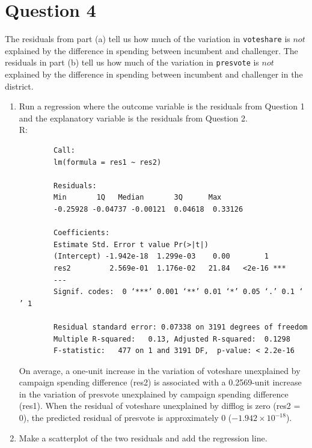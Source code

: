 \documentclass[12pt,letterpaper]{article}
\begin{document}
\section*{Question 4}
\noindent The residuals from part (a) tell us how much of the variation in \texttt{voteshare} is $not$ explained by the difference in spending between incumbent and challenger. The residuals in part (b) tell us how much of the variation in \texttt{presvote} is $not$ explained by the difference in spending between incumbent and challenger in the district.
	\begin{enumerate}
		\item Run a regression where the outcome variable is the residuals from Question 1 and the explanatory variable is the residuals from Question 2.	\\
		
		R:
		
		\begin{verbatim}
		Call:
		lm(formula = res1 ~ res2)
		
		Residuals:
		Min       1Q   Median       3Q      Max 
		-0.25928 -0.04737 -0.00121  0.04618  0.33126 
		
		Coefficients:
		Estimate Std. Error t value Pr(>|t|)    
		(Intercept) -1.942e-18  1.299e-03    0.00        1    
		res2         2.569e-01  1.176e-02   21.84   <2e-16 ***
		---
		Signif. codes:  0 ‘***’ 0.001 ‘**’ 0.01 ‘*’ 0.05 ‘.’ 0.1 ‘ ’ 1
		
		Residual standard error: 0.07338 on 3191 degrees of freedom
		Multiple R-squared:   0.13,	Adjusted R-squared:  0.1298 
		F-statistic:   477 on 1 and 3191 DF,  p-value: < 2.2e-16
		\end{verbatim}
		On average, a one-unit increase in the variation of voteshare unexplained by campaign spending difference (res2) is associated with a 0.2569-unit increase in the variation of presvote unexplained by campaign spending difference (res1).
		When the residual of voteshare unexplained by difflog is zero (res2 = 0), the predicted residual of presvote is approximately 0 ($-1.942 \times 10^{-18}$).
		\vspace{.5cm}
		\item Make a scatterplot of the two residuals and add the regression line. \\
		

\end{enumerate}
\end{document}
